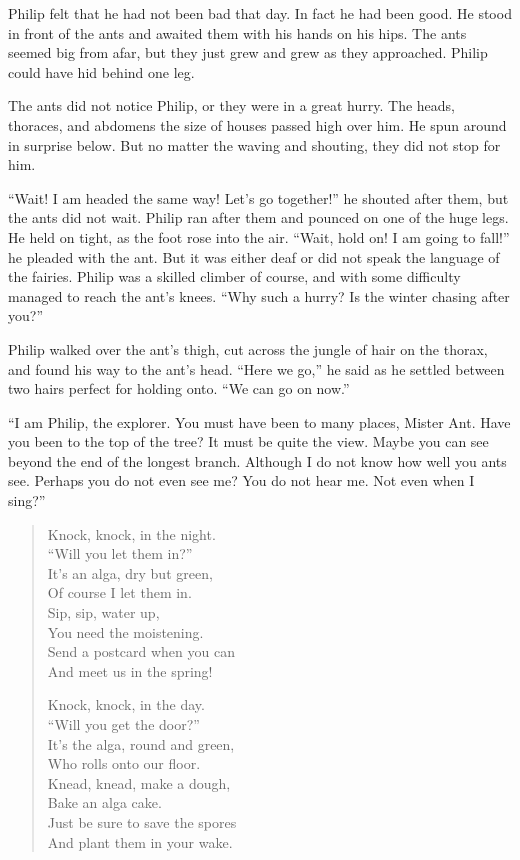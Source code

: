\documentclass[10pt, draft]{memoir}
\begin{document}
Philip felt that he had not been bad that day. In fact he had been good. He
stood in front of the ants and awaited them with his hands on his hips. The
ants seemed big from afar, but they just grew and grew as they approached.
Philip could have hid behind one leg.

The ants did not notice Philip, or they were in a great hurry. The heads,
thoraces, and abdomens the size of houses passed high over him. He spun around
in surprise below. But no matter the waving and shouting, they did not stop for
him.

``Wait! I am headed the same way! Let's go together!'' he shouted after them,
but the ants did not wait. Philip ran after them and pounced on one of the huge
legs. He held on tight, as the foot rose into the air. ``Wait, hold on! I am
going to fall!'' he pleaded with the ant. But it was either deaf or did not
speak the language of the fairies. Philip was a skilled climber of course, and
with some difficulty managed to reach the ant's knees. ``Why such a hurry? Is
the winter chasing after you?''

Philip walked over the ant's thigh, cut across the jungle of hair on the
thorax, and found his way to the ant's head. ``Here we go,'' he said as he
settled between two hairs perfect for holding onto. ``We can go on now.''

``I am Philip, the explorer. You must have been to many places, Mister Ant.
Have you been to the top of the tree? It must be quite the view. Maybe you can
see beyond the end of the longest branch. Although I do not know how well you
ants see. Perhaps you do not even see me? You do not hear me. Not even when I
sing?''


\begin{verse}

Knock, knock, in the night. \\
\vin ``Will you let them in?'' \\
It's an alga, dry but green, \\
\vin Of course I let them in. \\
Sip, sip, water up, \\
\vin You need the moistening. \\
Send a postcard when you can \\
\vin And meet us in the spring!

Knock, knock, in the day. \\
\vin ``Will you get the door?'' \\
It's the alga, round and green, \\
\vin Who rolls onto our floor. \\
Knead, knead, make a dough, \\
\vin Bake an alga cake. \\
Just be sure to save the spores \\
\vin And plant them in your wake.

\end{verse}
\end{document}
